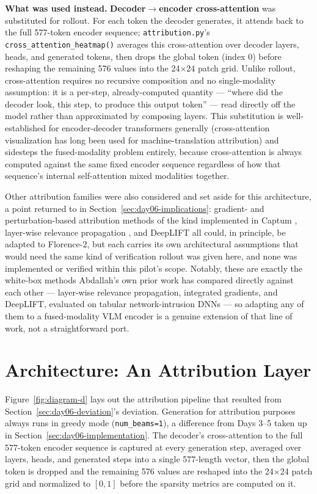 \textbf{What was used instead.} \textbf{Decoder$\to$encoder cross-attention} was substituted for
rollout. For each token the decoder generates, it attends back to the full 577-token encoder
sequence; \texttt{attribution.py}'s \texttt{cross\_attention\_heatmap()} averages this
cross-attention over decoder layers, heads, and generated tokens, then drops the global token
(index 0) before reshaping the remaining 576 values into the 24$\times$24 patch grid. Unlike
rollout, cross-attention requires no recursive composition and no single-modality assumption: it
is a per-step, already-computed quantity --- ``where did the decoder look, this step, to produce
this output token'' --- read directly off the model rather than approximated by composing layers.
This substitution is well-established for encoder-decoder transformers generally (cross-attention
visualization has long been used for machine-translation attribution) and sidesteps the fused-modality
problem entirely, because cross-attention is always computed against the same fixed encoder
sequence regardless of how that sequence's internal self-attention mixed modalities together.

Other attribution families were also considered and set aside for this architecture, a point
returned to in Section~\ref{sec:day06-implications}: gradient- and perturbation-based attribution
methods of the kind implemented in Captum \citep{kokhlikyan2020captum}, layer-wise relevance
propagation \citep{bach2015lrp}, and DeepLIFT \citep{shrikumar2017deeplift} all could, in
principle, be adapted to Florence-2, but each carries its own architectural assumptions that would
need the same kind of verification rollout was given here, and none was implemented or verified
within this pilot's scope. Notably, these are exactly the white-box methods Abdallah's own prior
work has compared directly against each other --- layer-wise relevance propagation, integrated
gradients, and DeepLIFT, evaluated on tabular network-intrusion DNNs \citep{arreche2025whitebox}
--- so adapting any of them to a fused-modality VLM encoder is a genuine extension of that line of
work, not a straightforward port.

\section{Architecture: An Attribution Layer}

Figure~\ref{fig:diagram-d} lays out the attribution pipeline that resulted from
Section~\ref{sec:day06-deviation}'s deviation. Generation for attribution purposes always runs in
greedy mode (\texttt{num\_beams=1}), a difference from Days 3--5 taken up in
Section~\ref{sec:day06-implementation}. The decoder's cross-attention to the full 577-token
encoder sequence is captured at every generation step, averaged over layers, heads, and generated
steps into a single 577-length vector, then the global token is dropped and the remaining 576
values are reshaped into the 24$\times$24 patch grid and normalized to $[0,1]$ before the sparsity
metrics are computed on it.

